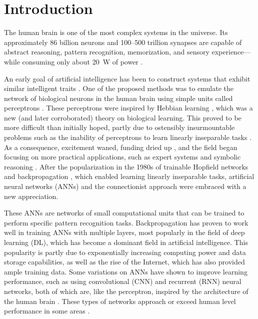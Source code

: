 \chapter{Introduction}\label{ch:introduction}

The human brain is one of the most complex systems in the universe.
Its approximately 86 billion neurons \citep{azevedo2009equal} and 100--500 trillion synapses \citep{drachman2005we} are capable of abstract reasoning, pattern recognition, memorization, and sensory experience---while consuming only about \SI{20}{\watt} of power \citep{sokoloff1960metabolism,drubach2000brain}.

An early goal of artificial intelligence has been to construct systems that exhibit similar intelligent traits \citep{turing1948intelligent}.
One of the proposed methods was to emulate the network of biological neurons in the human brain using simple units called perceptrons \citep{rosenblatt1958perceptron}.
These perceptrons were inspired by Hebbian learning \citep{hebb1949organization}, which was a new (and later corroborated) theory on biological learning.
This proved to be more difficult than initially hoped, partly due to ostensibly insurmountable problems such as the inability of perceptrons to learn linearly inseparable tasks \citep{minsky1969introduction}.
As a consequence, excitement waned, funding dried up \citep{crevier1993ai}, and the field began focusing on more practical applications, such as expert systems and symbolic reasoning \citep{haugeland1985artificial}.
After the popularization in the 1980s of trainable Hopfield networks \citep{hopfield1982neural} and backpropagation \citep{rumelhart1986learning}, which enabled learning linearly inseparable tasks, artificial neural networks (ANNs) and the connectionist approach were embraced with a new appreciation.

These ANNs are networks of small computational units that can be trained to perform specific pattern recognition tasks.
Backpropagation has proven to work well in training ANNs with multiple layers, most popularly in the field of deep learning (DL), which has become a dominant field in artificial intelligence.
This popularity is partly due to exponentially increasing computing power and data storage capabilities, as well as the rise of the Internet, which has also provided ample training data.
Some variations on ANNs have shown to improve learning performance, such as using convolutional (CNN) and recurrent (RNN) neural networks, both of which are, like the perceptron, inspired by the architecture of the human brain \citep{fukushima1982neocognitron,lecun1995convolutional,lukovsevivcius2009reservoir}.
These types of networks approach or exceed human level performance in some areas \citep{schmidhuber2015deep}.

